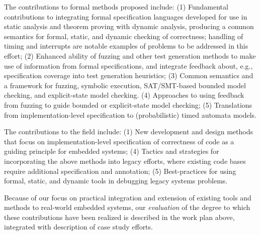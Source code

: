 The contributions to formal methods proposed include: (1)
Fundamental contributions to integrating formal specification
languages developed for use in static analysis and theorem proving
with dynamic analysis, producing a common semantics for formal,
static, and dynamic checking of correctness; handling of timing and
interrupts are notable examples of problems to be addressed in this effort;
(2) Enhanced ability of fuzzing and other test generation methods to
make use of information from formal specifications, and integrate
feedback about, e.g., specification coverage into test generation
heuristics;
(3) Common semantics and a framework for fuzzing, symbolic execution, SAT/SMT-based
bounded model checking, and explicit-state model checking.
(4) Approaches to using feedback from fuzzing to guide bounded or explicit-state model
checking;
(5) Translations from implementation-level specification to
(probabilistic) timed automata models.

The contributions to the field include:
(1)  New development and design methods that focus on
implementation-level specification of correctness of code as a guiding
principle for embedded systems; (4) Tactics and strategies for incorporating the above methods into
legacy efforts, where existing code bases require additional
specification and annotation; (5) Best-practices for using formal, static, and dynamic tools in
debugging legacy systems problems.


Because of our focus on practical integration and extension of
existing tools and methods to real-world embedded systems,
our \emph{evaluation} of the degree to which these contributions have
been realized is described in the work plan above, integrated with
description of case study efforts.